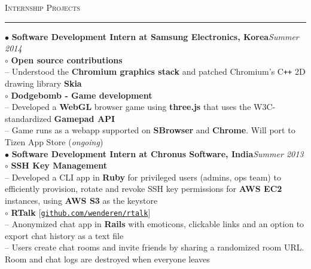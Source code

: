 \documentclass[a4paper,9pt]{article}
\begin{document}
\Large{\textsc{Internship Projects}}\vspace{1.5pt}
\hrule\vspace{0.25cm}
\normalsize
$\bullet$ \textbf{Software Development Intern at Samsung Electronics, Korea}\hfill \textit{Summer 2014}\\
$\circ$ \textbf{Open source contributions}\\
-- Understood the \textbf{Chromium graphics stack} and patched Chromium's C\verb!++! 2D drawing library \textbf{Skia}\\
$\circ$ \textbf{Dodgebomb - Game development}\\
-- Developed a \textbf{WebGL} browser game using \textbf{three.js} that uses the W3C-standardized \textbf{Gamepad API}\\
-- Game runs as a webapp supported on \textbf{SBrowser} and \textbf{Chrome}. Will port to Tizen App Store (\textit{ongoing})\\
$\bullet$ \textbf{Software Development Intern at Chronus Software, India}\hfill \textit{Summer 2013}\\
$\circ$ \textbf{SSH Key Management}\\
-- Developed a CLI app in \textbf{Ruby} for privileged users (admins, ops team) to efficiently provision, rotate and revoke SSH key permissions for \textbf{AWS EC2} instances, using \textbf{AWS S3} as the keystore\\
$\circ$ \textbf{RTalk} [\href{https://github.com/wenderen/rtalk}{\texttt{github.com/wenderen/rtalk}}]\\
-- Anonymized chat app in \textbf{Rails} with emoticons, clickable links and an option to export chat history as a text file\\
-- Users create chat rooms and invite friends by sharing a randomized room URL. Room and chat logs are destroyed when everyone leaves\\
\end{document}
